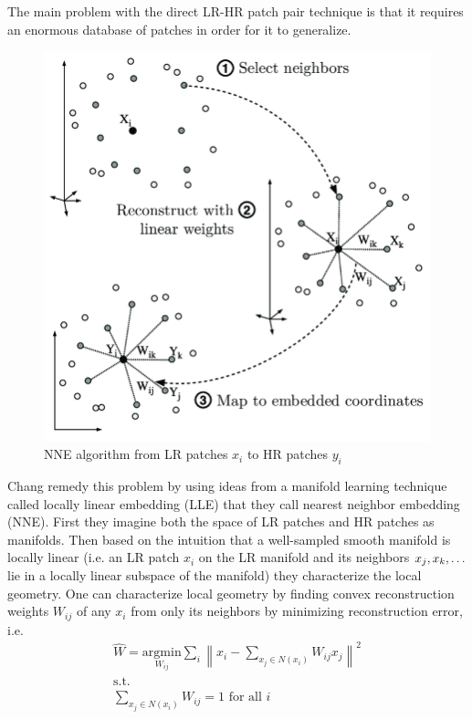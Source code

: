 The main problem with the direct LR-HR patch pair technique is that it requires an enormous database of patches in order for it to generalize.
%
\begin{figure}
    \centering
    \includegraphics[width=\linewidth,keepaspectratio]{figures/lle.png}
    \caption{NNE algorithm from LR patches $x_i$ to HR patches $y_i$\cite{Guillermophdthesis}}
    \label{fig:lle}
\end{figure}
Chang \etal remedy this problem by using ideas from a manifold learning technique called locally linear embedding\cite{saul2000introduction} (LLE) that they call nearest neighbor embedding (NNE).
%
First they imagine both the space of LR patches and HR patches as manifolds.
%
Then based on the intuition that a well-sampled smooth manifold is locally linear (i.e. an LR patch $x_i$ on the LR manifold and its neighbors $x_j, x_k, \mathellipsis$ lie in a locally linear subspace of the manifold) they characterize the local geometry.
%
One can characterize local geometry by finding convex reconstruction weights $W_{ij}$ of any $x_i$ from only its neighbors by minimizing reconstruction error, i.e.
\begin{gather}
    \hat{W} = \underset{W_{ij}}{\text{argmin}} \sum_i \left\| x_i - \sum_{x_j \in N(x_i)} W_{ij} x_j  \right\|^2 \nonumber \\
    \text{s.t.} \\
    \sum_{x_j \in N(x_i)} W_{ij} = 1 \text{ for all }i \nonumber
\end{gather}
